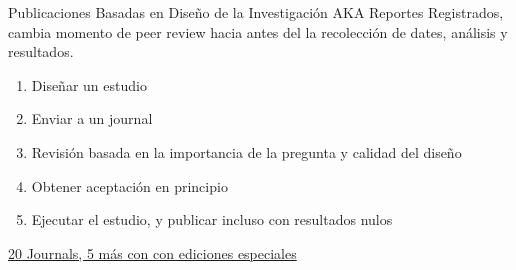 \documentclass{beamer}
\begin{document}
 { %
    \begin{frame}[plain, label=AEAreg]
     \end{frame}
}

\begin{frame}{Publicaciones Basadas en Diseño de la Investigación}
AKA Reportes Registrados, cambia momento de peer review hacia antes del la recolección de dates, análisis y resultados. 

\begin{enumerate}[<.->]
\item Diseñar un estudio
\item Enviar a un journal
\item Revisión basada en la importancia de la pregunta y calidad del diseño
\item Obtener aceptación en principio
\item Ejecutar el estudio, y publicar incluso con resultados nulos
\end{enumerate}
\href{https://osf.io/8mpji/wiki/home/}{20 Journals, 5 más con con ediciones especiales }
\end{frame}
\end{document}
